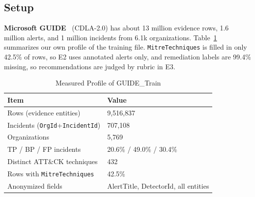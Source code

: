 \documentclass[conference]{IEEEtran}
\begin{document}
\subsection{Setup}
\textbf{Microsoft GUIDE}~\cite{freitas2024cgr} (CDLA-2.0) has about 13
million evidence rows, 1.6 million alerts, and 1 million incidents from
6.1k organizations. Table~\ref{tab:guide} summarizes our own profile of
the training file. \texttt{MitreTechniques} is filled in only 42.5\% of
rows, so E2 uses annotated alerts only, and remediation labels are
99.4\% missing, so recommendations are judged by rubric in E3.

\begin{table}[t]
\caption{Measured Profile of GUIDE\_Train}
\label{tab:guide}
\centering
\footnotesize
\begin{tabular}{@{}ll@{}}
\toprule
\textbf{Item} & \textbf{Value} \\
\midrule
Rows (evidence entities) & 9{,}516{,}837 \\
Incidents (\texttt{OrgId}+\texttt{IncidentId}) & 707{,}108 \\
Organizations & 5{,}769 \\
TP / BP / FP incidents & 20.6\% / 49.0\% / 30.4\% \\
Distinct ATT\&CK techniques & 432 \\
Rows with \texttt{MitreTechniques} & 42.5\% \\
Anonymized fields & AlertTitle, DetectorId, all entities \\
\bottomrule
\end{tabular}
\end{table}
\end{document}
